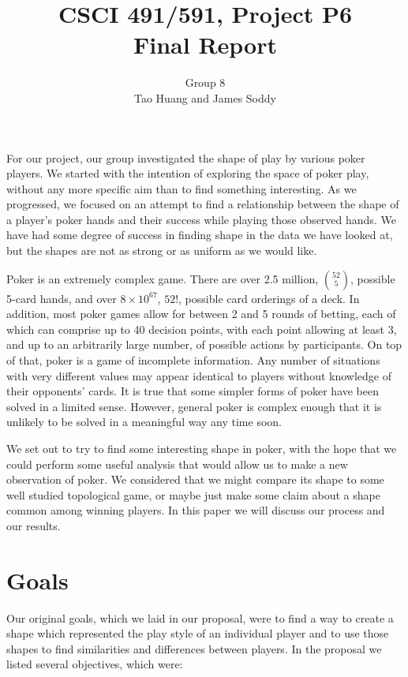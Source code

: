 \documentclass[11pt]{article}
\title{CSCI 491/591, Project P6\\
		\small{Final Report}}
\author{Group 8\\
		\small{Tao Huang and James Soddy}}
\begin{document}
\maketitle

For our project, our group investigated the shape of play by various
poker players. We started with the intention of exploring the space of poker
play, without any more specific aim than to find something interesting. As we
progressed, we focused on an attempt to find a 
relationship between the shape of a player's poker hands and their success
while playing those observed hands. We have had some degree of success in finding
shape in the data we have looked at, but the shapes are not as strong or as 
uniform as we would like. 

Poker is an extremely complex game. There are over 2.5 million, ${52 \choose 5}$,
possible 5-card hands, and over $8\times10^{67}$, $52!$, possible card orderings
of a deck. In addition, most poker games allow for between 2 and 5 rounds of betting,
each of which can comprise up to 40 decision points, with each point allowing
at least 3, and up to an arbitrarily large number, of possible actions by participants. On
top of that, poker is a game of incomplete information. Any number of situations
with very different values may appear identical to players without knowledge
of their opponents' cards. It is true that some simpler forms of poker have been
solved in a limited sense. However, general poker is complex
enough that it is unlikely to be solved in a meaningful way any time soon.

We set out to try to find some interesting shape in poker, with the hope that
we could perform some useful analysis that would allow us to make a new
observation of poker. We considered that we might compare its shape to some
well studied topological game, or maybe just make some claim about a
shape common among winning players. In this paper we will discuss our process
and our results.

\section*{Goals}
Our original goals, which we laid in our proposal, were to find a way to create
a shape which represented the play style of an individual player and to use those
shapes to find similarities and differences between players. In the proposal
we listed several objectives, which were:
\end{document}
